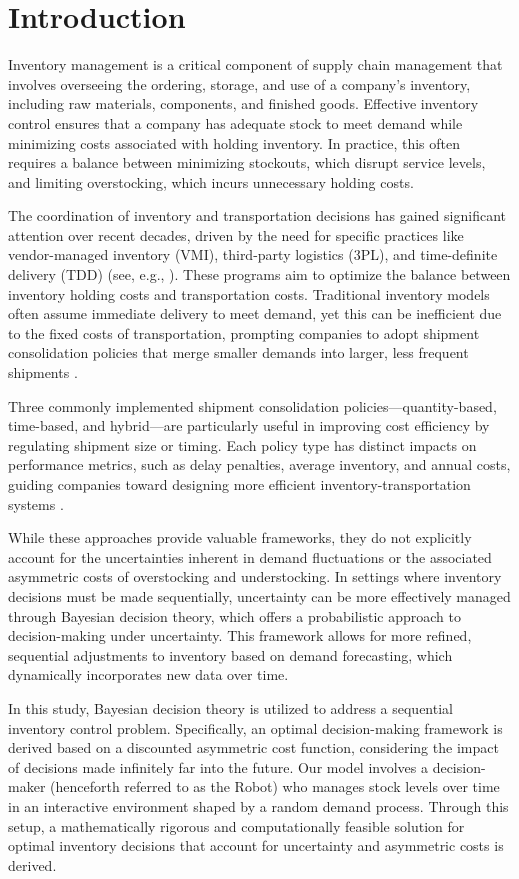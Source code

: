 \section{Introduction}
Inventory management is a critical component of supply chain management that involves overseeing the ordering, storage, and use of a company's inventory, including raw materials, components, and finished goods. Effective inventory control ensures that a company has adequate stock to meet demand while minimizing costs associated with holding inventory. In practice, this often requires a balance between minimizing stockouts, which disrupt service levels, and limiting overstocking, which incurs unnecessary holding costs.

The coordination of inventory and transportation decisions has gained significant attention over recent decades, driven by the need for specific practices like vendor-managed inventory (VMI), third-party logistics (3PL), and time-definite delivery (TDD) (see, e.g., \citep{CetinkayaLee2000, Alumur2012, Gurler2014}). These programs aim to optimize the balance between inventory holding costs and transportation costs. Traditional inventory models often assume immediate delivery to meet demand, yet this can be inefficient due to the fixed costs of transportation, prompting companies to adopt shipment consolidation policies that merge smaller demands into larger, less frequent shipments \citep{CetinkayaBookbinder2003, HigginsonBookbinder1994}.

Three commonly implemented shipment consolidation policies—quantity-based, time-based, and hybrid—are particularly useful in improving cost efficiency by regulating shipment size or timing. Each policy type has distinct impacts on performance metrics, such as delay penalties, average inventory, and annual costs, guiding companies toward designing more efficient inventory-transportation systems \citep{Cetinkaya2005, Wei2020, Cetinkaya2006}.

While these approaches provide valuable frameworks, they do not explicitly account for the uncertainties inherent in demand fluctuations or the associated asymmetric costs of overstocking and understocking. In settings where inventory decisions must be made sequentially, uncertainty can be more effectively managed through Bayesian decision theory, which offers a probabilistic approach to decision-making under uncertainty. This framework allows for more refined, sequential adjustments to inventory based on demand forecasting, which dynamically incorporates new data over time.

In this study, Bayesian decision theory is utilized to address a sequential inventory control problem. Specifically, an optimal decision-making framework is derived based on a discounted asymmetric cost function, considering the impact of decisions made infinitely far into the future. Our model involves a decision-maker (henceforth referred to as the Robot) who manages stock levels over time in an interactive environment shaped by a random demand process. Through this setup, a mathematically rigorous and computationally feasible solution for optimal inventory decisions that account for uncertainty and asymmetric costs is derived.
